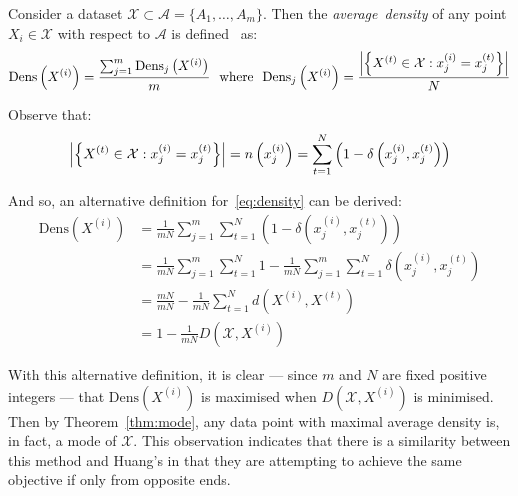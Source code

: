 \begin{definition}\label{def:density}	
    Consider a dataset
    \(\mathcal{X} \subset \mathcal{A} = \{A_1, \ldots, A_m\}\). Then the
    \emph{average~density} of any point \(X_i \in \mathcal{X}\) with respect to
    \(\mathcal{A}\) is defined~\cite{Cao2009} as:
    \begin{equation}\label{eq:density}
        \text{Dens}\left(X^{(i)}\right) = \frac{%
            \sum_{j=1}^m \text{Dens}_{j}\left(X^{(i)}\right)
        }{m}
        \ \ \text{where} \ \
        \text{Dens}_{j}\left(X^{(i)}\right) = \frac{%
            \abs*{%
                \left\{X^{(t)} \in \mathcal{X} : x_j^{(i)} = x_j^{(t)}\right\}
            }
        }{N}
    \end{equation}

    Observe that:
    \[
        \abs*{\left\{X^{(t)} \in \mathcal{X} : x_j^{(i)} = x_j^{(t)}\right\}}%
        = n\left(x_j^{(i)}\right)%
        = \sum_{t=1}^N \left(1 - \delta\left(x_j^{(i)}, x_j^{(t)}\right)\right)
    \]

    And so, an alternative definition for~\eqref{eq:density} can be derived:
    \begin{equation}\label{eq:density-alt}
    \begin{aligned}
        \text{Dens}\left(X^{(i)}\right)
        & = \frac{1}{mN} \sum_{j=1}^m \sum_{t=1}^N \left(%
            1 - \delta\left(x_j^{(i)}, x_j^{(t)}\right)
        \right)\\
        & = \frac{1}{mN} \sum_{j=1}^m \sum_{t=1}^N 1%
            - \frac{1}{mN} \sum_{j=1}^m \sum_{t=1}^N
            \delta\left(x_j^{(i)}, x_j^{(t)}\right)\\
        & = \frac{mN}{mN} - \frac{1}{mN} \sum_{t=1}^N
            d\left(X^{(i)}, X^{(t)}\right)\\
        & = 1 - \frac{1}{mN} D\left(\mathcal{X}, X^{(i)}\right)
    \end{aligned}
    \end{equation}

    With this alternative definition, it is clear --- since \(m\) and \(N\) are
    fixed positive integers --- that \(\text{Dens}(X^{(i)})\) is maximised when
    \(D(\mathcal{X}, X^{(i)})\) is minimised. Then by Theorem~\ref{thm:mode},
    any data point with maximal average density is, in fact, a mode of
    \(\mathcal{X}\). This observation indicates that there is a similarity
    between this method and Huang's in that they are attempting to achieve the
    same objective if only from opposite ends.
\end{definition}


%
